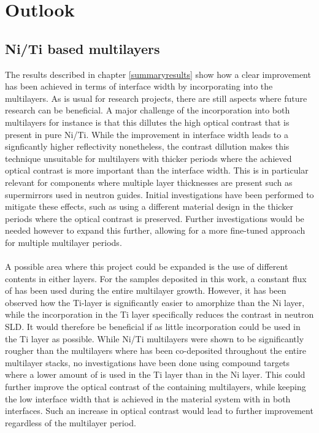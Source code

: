 \chapter{Outlook}\label{outlook}
\section{Ni/Ti based multilayers}
The results described in chapter \ref{summaryresults} show how a clear improvement has been achieved in terms of interface width by incorporating \BC into the multilayers. As is usual for research projects, there are still aspects where future research can be beneficial. A major challenge of the \BC incorporation into both multilayers for instance is that this dillutes the high optical contrast that is present in pure Ni/Ti. While the improvement in interface width leads to a signficantly higher reflectivity nonetheless, the contrast dillution makes this technique unsuitable for multilayers with thicker periods where the achieved optical contrast is more important than the interface width. This is in particular relevant for components where multiple layer thicknesses are present such as supermirrors used in neutron guides. Initial investigations have been performed to mitigate these effects, such as using a different material design in the thicker periods where the optical contrast is preserved. Further investigations would be needed however to expand this further, allowing for a more fine-tuned approach for multiple multilayer periods. \\
\\
A possible area where this project could be expanded is the use of different \BC contents in either layers. For the samples deposited in this work, a constant flux of \BC has been used during the entire multilayer growth. However, it has been observed how the Ti-layer is significantly easier to amorphize than the Ni layer, while the \BC incorporation in the Ti layer specifically reduces the contrast in neutron SLD. It would therefore be beneficial if as little \BC incorporation could be used in the Ti layer as possible. While Ni\BCs/Ti multilayers were shown to be significantly rougher than the multilayers where \BC has been co-deposited throughout the entire multilayer stacks, no investigations have been done using compound targets where a lower amount of \BC is used in the Ti layer than in the Ni layer. This could further improve the optical contrast of the \BC containing multilayers, while keeping the low interface width that is achieved in the material system with \BC in both interfaces. Such an increase in optical contrast would lead to further improvement regardless of the multilayer period.\\
